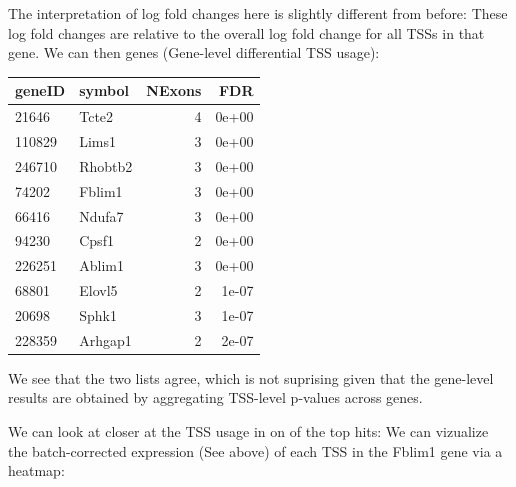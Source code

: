 \documentclass[9pt,a4paper,]{extarticle}
\newenvironment{Shaded}{\begin{snugshade}}{\end{snugshade}}
\newcommand{\KeywordTok}[1]{\textcolor[rgb]{0.13,0.29,0.53}{\textbf{{#1}}}}
\newcommand{\DataTypeTok}[1]{\textcolor[rgb]{0.13,0.29,0.53}{{#1}}}
\newcommand{\DecValTok}[1]{\textcolor[rgb]{0.00,0.00,0.81}{{#1}}}
\newcommand{\StringTok}[1]{\textcolor[rgb]{0.31,0.60,0.02}{{#1}}}
\newcommand{\OtherTok}[1]{\textcolor[rgb]{0.56,0.35,0.01}{{#1}}}
\newcommand{\NormalTok}[1]{{#1}}
\begin{document}
The interpretation of log fold changes here is slightly different from before: These log fold changes are relative to the overall log fold change for all TSSs in that gene. We can then genes (Gene-level differential TSS usage):

\begin{Shaded}
\end{Shaded}

\begin{tabular}{l|l|r|r}
\hline
geneID & symbol & NExons & FDR\\
\hline
21646 & Tcte2 & 4 & 0e+00\\
\hline
110829 & Lims1 & 3 & 0e+00\\
\hline
246710 & Rhobtb2 & 3 & 0e+00\\
\hline
74202 & Fblim1 & 3 & 0e+00\\
\hline
66416 & Ndufa7 & 3 & 0e+00\\
\hline
94230 & Cpsf1 & 2 & 0e+00\\
\hline
226251 & Ablim1 & 3 & 0e+00\\
\hline
68801 & Elovl5 & 2 & 1e-07\\
\hline
20698 & Sphk1 & 3 & 1e-07\\
\hline
228359 & Arhgap1 & 2 & 2e-07\\
\hline
\end{tabular}

We see that the two lists agree, which is not suprising given that the gene-level results are obtained by aggregating TSS-level p-values across genes.

We can look at closer at the TSS usage in on of the top hits: We can vizualize the batch-corrected expression (See above) of each TSS in the Fblim1 gene via a heatmap:

\begin{Shaded}
\end{Shaded}
\end{document}
